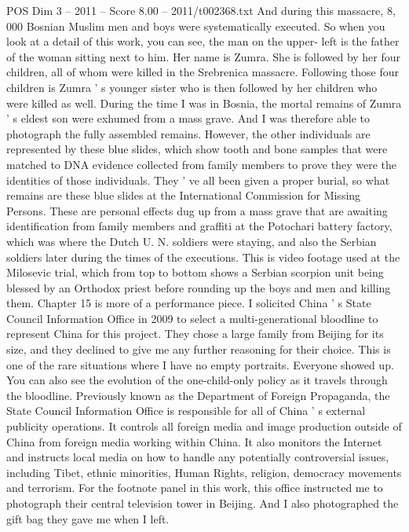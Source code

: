\begin{textsample}{POS Dim 3 – 2011 – Score 8.00 – 2011/t002368.txt}
And during this massacre, 8, 000 Bosnian Muslim men and boys were systematically executed.
So when you look at a detail of this work, you can see, the man on the upper- left is the father of the woman sitting next to him.
Her name is Zumra.
She is followed by her four children, all of whom were killed in the Srebrenica massacre.
Following those four children is Zumra ' s younger sister who is then followed by her children who were killed as well.
During the time I was in Bosnia, the mortal remains of Zumra ' s eldest son were exhumed from a mass grave.
And I was therefore able to photograph the fully assembled remains.
However, the other individuals are represented by these blue slides, which show tooth and bone samples that were matched to DNA evidence collected from family members to prove they were the identities of those individuals.
They ' ve all been given a proper burial, so what remains are these blue slides at the International Commission for Missing Persons.
These are personal effects dug up from a mass grave that are awaiting identification from family members and graffiti at the Potochari battery factory, which was where the Dutch U.
N. soldiers were staying, and also the Serbian soldiers later during the times of the executions.
This is video footage used at the Milosevic trial, which from top to bottom shows a Serbian scorpion unit being blessed by an Orthodox priest before rounding up the boys and men and killing them.
Chapter 15 is more of a performance piece.
I solicited China ' s State Council Information Office in 2009 to select a multi-generational bloodline to represent China for this project.
They chose a large family from Beijing for its size, and they declined to give me any further reasoning for their choice.
This is one of the rare situations where I have no empty portraits.
Everyone showed up.
You can also see the evolution of the one-child-only policy as it travels through the bloodline.
Previously known as the Department of Foreign Propaganda, the State Council Information Office is responsible for all of China ' s external publicity operations.
It controls all foreign media and image production outside of China from foreign media working within China.
It also monitors the Internet and instructs local media on how to handle any potentially controversial issues, including Tibet, ethnic minorities, Human Rights, religion, democracy movements and terrorism.
For the footnote panel in this work, this office instructed me to photograph their central television tower in Beijing.
And I also photographed the gift bag they gave me when I left.

\end{textsample}
